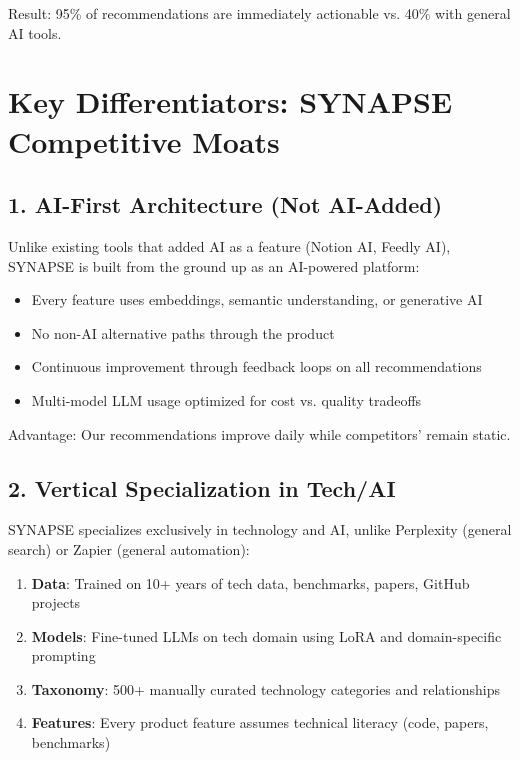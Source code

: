 \documentclass{report}
\begin{document}
Result: 95\% of recommendations are immediately actionable vs. 40\% with general AI tools.

\section{Key Differentiators: SYNAPSE Competitive Moats}

\subsection{1. AI-First Architecture (Not AI-Added)}

Unlike existing tools that added AI as a feature (Notion AI, Feedly AI), SYNAPSE is built from the ground up as an AI-powered platform:

\begin{itemize}
    \item Every feature uses embeddings, semantic understanding, or generative AI
    \item No non-AI alternative paths through the product
    \item Continuous improvement through feedback loops on all recommendations
    \item Multi-model LLM usage optimized for cost vs. quality tradeoffs
\end{itemize}

Advantage: Our recommendations improve daily while competitors' remain static.

\subsection{2. Vertical Specialization in Tech/AI}

SYNAPSE specializes exclusively in technology and AI, unlike Perplexity (general search) or Zapier (general automation):

\begin{enumerate}
    \item \textbf{Data}: Trained on 10+ years of tech data, benchmarks, papers, GitHub projects
    \item \textbf{Models}: Fine-tuned LLMs on tech domain using LoRA and domain-specific prompting
    \item \textbf{Taxonomy}: 500+ manually curated technology categories and relationships
    \item \textbf{Features}: Every product feature assumes technical literacy (code, papers, benchmarks)
\end{enumerate}
\end{document}
